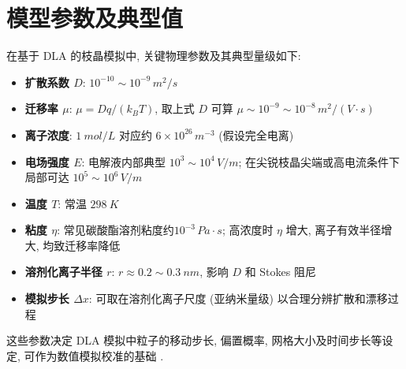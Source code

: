 \documentclass[12pt,a4paper]{article}
\begin{document}
	\section*{模型参数及典型值}
		在基于 DLA 的枝晶模拟中, 关键物理参数及其典型量级如下:

		\begin{itemize}
			\item \textbf{扩散系数 $D$}: $10^{-10} \sim 10^{-9}\,\si{m^{2}/s}$ \cite{ref4}
			\item \textbf{迁移率 $\mu$}: $\mu=Dq/(k_{B}T)$, 取上式 $D$ 可算 $\mu \sim 10^{-9} \sim 10^{-8}\,\si{m^{2}/(V\cdot s)}$
			\item \textbf{离子浓度}: $\SI{1}{mol/L}$ 对应约 $6 \times 10^{26}\,\si{m^{-3}}$ (假设完全电离)
			\item \textbf{电场强度 $E$}: 电解液内部典型 $10^{3} \sim 10^{4}\,\si{V/m}$; 在尖锐枝晶尖端或高电流条件下局部可达 $10^{5} \sim 10^{6}\,\si{V/m}$
			\item \textbf{温度 $T$}: 常温 $\SI{298}{K}$
			\item \textbf{粘度 $\eta$}: 常见碳酸酯溶剂粘度约$10^{-3}\,\si{Pa\cdot s}$; 高浓度时 $\eta$ 增大, 离子有效半径增大, 均致迁移率降低 \cite{ref3}
			\item \textbf{溶剂化离子半径 $r$}: $r \approx 0.2 \sim \SI{0.3}{nm}$, 影响 $D$ 和 Stokes 阻尼
			\item \textbf{模拟步长 $\Delta x$}: 可取在溶剂化离子尺度 (亚纳米量级) 以合理分辨扩散和漂移过程
		\end{itemize}

		这些参数决定 DLA 模拟中粒子的移动步长, 偏置概率, 网格大小及时间步长等设定, 可作为数值模拟校准的基础 \cite{ref3, ref4}.

	\newpage

	
\end{document}
